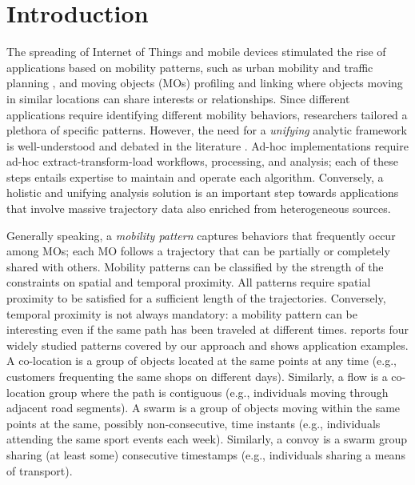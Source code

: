\documentclass[
]{ceurart}
\begin{document}
\section{Introduction}\label{sec:intro}
The spreading of Internet of Things and mobile devices \citep{vitali2021crop} stimulated the rise of applications based on mobility patterns, such as urban mobility and traffic planning \citep{DBLP:journals/tits/KumarWRLKP18}, and moving objects (MOs) profiling and linking \citep{francia2020dart,DBLP:journals/isci/FranciaGR20} where objects moving in similar locations can share interests or relationships.
Since different applications require identifying different mobility behaviors, researchers tailored a plethora of specific patterns.
However, the need for a \textit{unifying} analytic framework is well-understood and debated in the literature \citep{DBLP:journals/pvldb/DingCGJB18,DBLP:journals/jdwm/Kwakye20}.
Ad-hoc implementations require ad-hoc extract-transform-load workflows, processing, and analysis; each of these steps entails expertise to maintain and operate each algorithm. Conversely, a holistic and unifying analysis solution is an important step towards applications that involve massive trajectory data \citep{DBLP:journals/pvldb/DingCGJB18} also enriched from heterogeneous sources.

Generally speaking, a \textit{mobility pattern} captures behaviors that frequently occur among MOs; each MO follows a trajectory that can be partially or completely shared with others.
Mobility patterns can be classified by the strength of the constraints on spatial and temporal proximity.
All patterns require spatial proximity to be satisfied for a sufficient length of the trajectories.
Conversely, temporal proximity is not always mandatory: a mobility pattern can be interesting even if the same path has been traveled at different times.
 reports four widely studied patterns covered by our approach and shows application examples.
A co-location \citep{bao2021mining} is a group of objects located at the same points at any time (e.g., customers frequenting the same shops on different days).
Similarly, a flow \citep{DBLP:journals/tmc/HanLO15} is a co-location group where the path is contiguous (e.g., individuals moving through adjacent road segments).
A swarm \citep{DBLP:journals/pvldb/LiDHK10} is a group of objects moving within the same points at the same, possibly non-consecutive, time instants (e.g., individuals attending the same sport events each week).
Similarly, a convoy \citep{DBLP:journals/pvldb/JeungYZJS08} is a swarm group sharing (at least some) consecutive timestamps (e.g., individuals sharing a means of transport).
\end{document}
